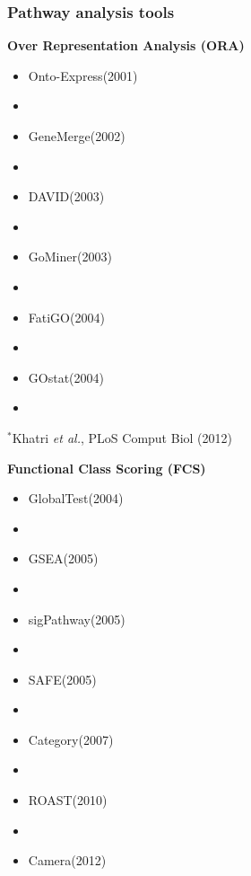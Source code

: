\documentclass[9pt,t]{beamer}
\begin{document}
\begin{frame}[c]
\frametitle{Pathway analysis tools}
\begin{minipage}[t]{0.45\textwidth}
\flushleft
\textbf{\color{oxygenpurple}Over Representation Analysis (ORA)}
\vspace{0.1cm}
\begin{itemize}
\item Onto-Express(2001)
\item[]
\item GeneMerge(2002)
\item[]
\item DAVID(2003) 
\item[]
\item GoMiner(2003)
\item[]
\item FatiGO(2004)
\item[]
\item GOstat(2004)
\item[]
\end{itemize}
\vfill
\hfill $^*$\footnotesize Khatri \emph{et al.},  PLoS Comput Biol (2012)
\end{minipage}
\hspace{0.4cm}
\begin{minipage}[t]{0.45\textwidth}
\flushleft
\textbf{\color{oxygenpurple}Functional Class Scoring (FCS)}
\vspace{0.1cm}
\begin{itemize}
\item GlobalTest(2004)
\item[]
\item GSEA(2005)
\item[]
\item sigPathway(2005)
\item[]
\item SAFE(2005)
\item[]
\item Category(2007)
\item[]
\item {\ttfamily ROAST}(2010)
\item[]
\item Camera(2012)
\end{itemize}
\end{minipage}
\end{frame}

\end{document}
